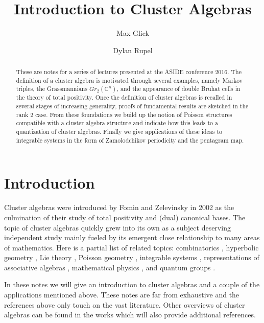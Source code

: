 \documentclass{amsart}
\title{Introduction to Cluster Algebras}
\author{Max Glick}
\author{Dylan Rupel}
\theoremstyle{definition}
\theoremstyle{remark}
\numberwithin{equation}{section}
\newcommand{\CC}{{\mathbb{C}}}
\begin{document}
\begin{abstract}
  These are notes for a series of lectures presented at the ASIDE conference 2016.  The definition of a cluster algebra is motivated through several examples, namely Markov triples, the Grassmannians $Gr_2(\CC^n)$, and the appearance of double Bruhat cells in the theory of total positivity.  Once the definition of cluster algebras is recalled in several stages of increasing generality, proofs of fundamental results are sketched in the rank 2 case.  From these foundations we build up the notion of Poisson structures compatible with a cluster algebra structure and indicate how this leads to a quantization of cluster algebras.  Finally we give applications of these ideas to integrable systems in the form of Zamolodchikov periodicity and the pentagram map.
\end{abstract}
\maketitle

\section{Introduction}
  Cluster algebras were introduced by Fomin and Zelevinsky \cite{FZ02} in 2002 as the culmination of their study of total positivity \cite{FZ99} and (dual) canonical bases.  The topic of cluster algebras quickly grew into its own as a subject deserving independent study mainly fueled by its emergent close relationship to many areas of mathematics.  Here is a partial list of related topics: combinatorics \cite{MP07}, hyperbolic geometry \cite{FG06,FST08,MSW13}, Lie theory \cite{GLS06}, Poisson geometry \cite{GSV03}, integrable systems \cite{dFK10,G11}, representations of associative algebras \cite{CC06,CK06,BMRRT06,R11,Q12,R15}, mathematical physics \cite{EF12,ABCGPT14}, and quantum groups \cite{K12,GLS13,KQ14,BR15}.

  In these notes we will give an introduction to cluster algebras and a couple of the applications mentioned above.  These notes are far from exhaustive and the references above only touch on the vast literature.  Other overviews of cluster algebras can be found in the works \cite{K10,W13,GLS} which will also provide additional references.
\end{document}
